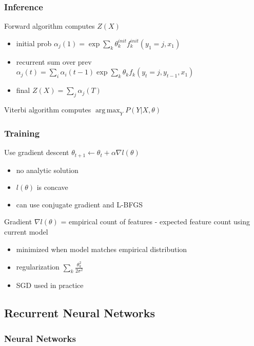 \documentclass[]{article}
\DeclareMathOperator*{\argmax}{arg\,max}
\theoremstyle{definition}
\begin{document}
\subsubsection{Inference}%
\label{ssub:inference}

Forward algorithm computes $Z(X)$
\begin{itemize}
    \item initial prob $\alpha_j(1) = \exp \sum_k \theta_k^{init} f_k^{init}(y_1 = j, x_1)$
    \item recurrent sum over prev $\alpha_j(t) = \sum_i \alpha_i(t-1)\exp \sum_k \theta_k f_k(y_t = j, y_{t-1}, x_1) $
    \item final $Z(X) = \sum_j \alpha_j(T)$
\end{itemize}

Viterbi algorithm computes $\argmax_Y P(Y|X,\theta)$


\subsubsection{Training}%
\label{ssub:training}

Use gradient descent $\theta_{t+1} \gets \theta_t + \alpha \nabla l(\theta)$
\begin{itemize}
    \item no analytic solution
    \item $l(\theta)$ is concave
    \item can use conjugate gradient and L-BFGS
\end{itemize}

Gradient $\nabla l(\theta)$ = empirical count of features - expected feature count using current model
\begin{itemize}
    \item minimized when model matches empirical distribution
    \item regularization $\sum_k \frac{\theta_k^2}{2\sigma^2}$
    \item SGD used in practice
\end{itemize}

\subsection{Recurrent Neural Networks}%
\label{sub:recurrent_neural_networks}

\subsubsection{Neural Networks}%
\label{ssub:neural_networks}
\end{document}
